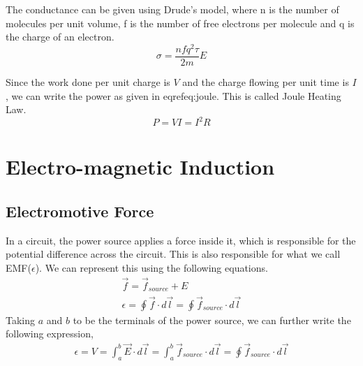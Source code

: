 \documentclass[12pt, oneside]{book}
\begin{document}
The conductance can be given using Drude's model, where n is the number of molecules per unit volume, f is the number of free electrons per molecule and q is the charge of an electron.
\begin{equation}
	\sigma = \frac{nfq^2\tau}{2m} E
\end{equation}


Since the work done per unit charge is $V$ and the charge flowing per unit time is $I$, we can write the power as given in eqref{eq:joule}. This is called Joule Heating Law.
\begin{equation}
	P=VI = I^2R
	\label{eq:joule}
\end{equation} 

\section{Electro-magnetic Induction}

\subsection{Electromotive Force}
In a circuit, the power source applies a force inside it, which is responsible for the potential difference across the circuit. This is also responsible for what we call EMF($\epsilon$). We can represent this using the following equations.
\begin{gather}
	\vec f = \vec f_{source} + E\\
	\epsilon = \oint \vec f \cdot d\vec l = \oint \vec f_{source} \cdot d\vec l 
\end{gather}
Taking $a$ and $b$ to be the terminals of the power source, we can further write the following expression,
\begin{gather}
	\epsilon = V = \int_{a}^{b} \vec E \cdot d\vec l = \int_{a}^{b} \vec f_{source} \cdot d\vec l = \oint \vec f_{source} \cdot d\vec l
\end{gather}
\end{document}
